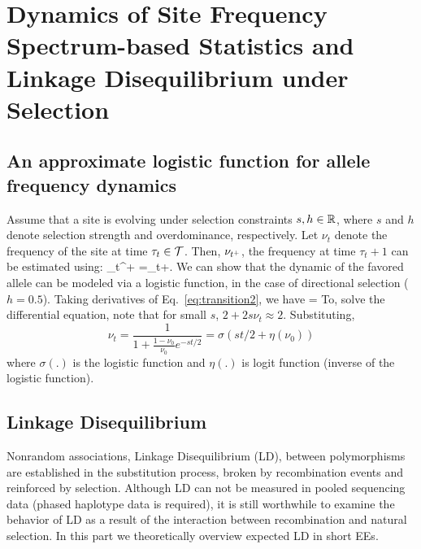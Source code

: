 

\section{Dynamics of Site Frequency Spectrum-based Statistics and Linkage 
	Disequilibrium under Selection }\label{app}
\subsection{An approximate logistic function  for allele frequency dynamics} 
\label{app:af}
Assume that a site is evolving under selection constraints $s,h\in
{\mathbb R}$, where $s$ and $h$ denote selection strength and overdominance,
respectively. Let $\nu_t$ denote the frequency of the site at time
$\tau_t\in {\cal T}$. Then, $\nu_{t^+}$, the frequency at time $\tau_t+1$
can be estimated using:
\beq
\hat{\nu}_{t^+}
=\nu_t+.
  \label{eq:transition2}
\eeq
We can show that the dynamic of the favored allele can be modeled
via a logistic function, in the case of directional selection
($h=0.5$). Taking derivatives of Eq.~\ref{eq:transition2}, we have
\beq {} = 
\eeq To, solve the differential equation, note that for small $s$,
$2+2s\nu_t \approx 2$. Substituting,
\begin{equation}
\nu_t =\frac{1}{1+\frac{1-\nu_0}{\nu_0}e^{-st/2}} = \sigma(st/2+\eta(\nu_0)) 
\label{eq:inf-pop}
\end{equation}
where $\sigma(.)$ is the logistic function and $\eta(.)$ is logit function 
(inverse of the logistic function). 



\subsection{Linkage Disequilibrium}\label{app:ld}
Nonrandom associations, Linkage Disequilibrium (LD), between 
polymorphisms are established in the 
substitution process, broken by recombination events 
and reinforced by selection. 
Although LD can not be measured in pooled sequencing data (phased 
haplotype data is required), it is still worthwhile 
to examine the behavior of LD as a result of the interaction between 
recombination and natural selection. In this part we theoretically overview 
expected LD in short EEs.

